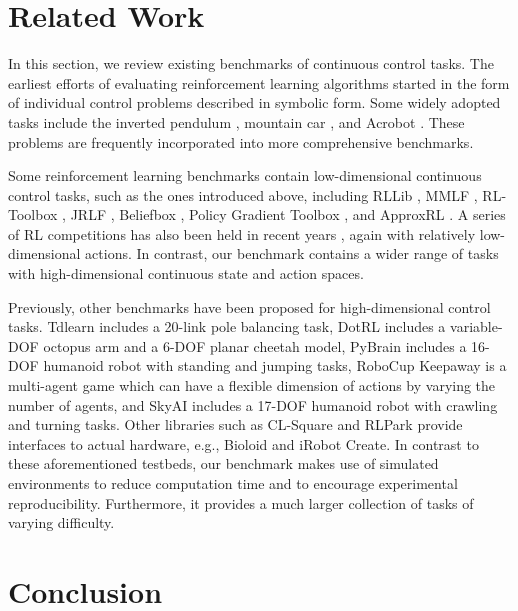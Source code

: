 \documentclass{article}
\begin{document}
\section{Related Work}
\label{section:related_work}

In this section, we review existing benchmarks of continuous control tasks. The earliest efforts of evaluating reinforcement learning algorithms started in the form of individual control problems described in symbolic form. Some widely adopted tasks include the inverted pendulum \cite{stephenson1908xx, donaldson1960error, widrow1964pattern}, mountain car \cite{Moore90MountainCar}, and Acrobot \cite{dejong1994swinging}.
These problems are frequently incorporated into more comprehensive benchmarks.

Some reinforcement learning benchmarks contain low-dimensional continuous control tasks, such as the ones introduced above, including RLLib \cite{RLLibCapital}, MMLF \cite{MMLF}, RL-Toolbox \cite{RLToolbox},
JRLF \cite{JRLF},
Beliefbox \cite{BeliefBox}, Policy Gradient Toolbox \cite{PolicyGradientToolbox}, and ApproxRL \cite{ApproxRL}. A series of RL competitions has also been held in recent years \cite{dutech2005reinforcement, dimitrakakis2014reinforcement}, again with relatively low-dimensional actions. In contrast, our benchmark contains a wider range of tasks with high-dimensional continuous state and action spaces.

Previously, other benchmarks have been proposed for high-dimensional control tasks. Tdlearn \cite{tdlearn} includes a 20-link pole balancing task, DotRL \cite{dotRL} includes a variable-DOF octopus arm and a 6-DOF planar cheetah model, PyBrain \cite{PyBrain} includes a 16-DOF humanoid robot with standing and jumping tasks, RoboCup Keepaway \cite{stone2005keepaway} is a multi-agent game which can have a flexible dimension of actions by varying the number of agents, and SkyAI \cite{SkyAI} includes a 17-DOF humanoid robot with crawling and turning tasks. Other libraries such as CL-Square \cite{CLSquare} and RLPark \cite{RLPark}
provide interfaces to actual hardware, e.g., Bioloid and iRobot Create. In contrast to these aforementioned testbeds, our benchmark makes use of simulated environments to reduce computation time and to encourage experimental reproducibility. Furthermore, it provides a much larger collection of tasks of varying difficulty.






\section{Conclusion}
\label{section:conclusion}
\end{document}
